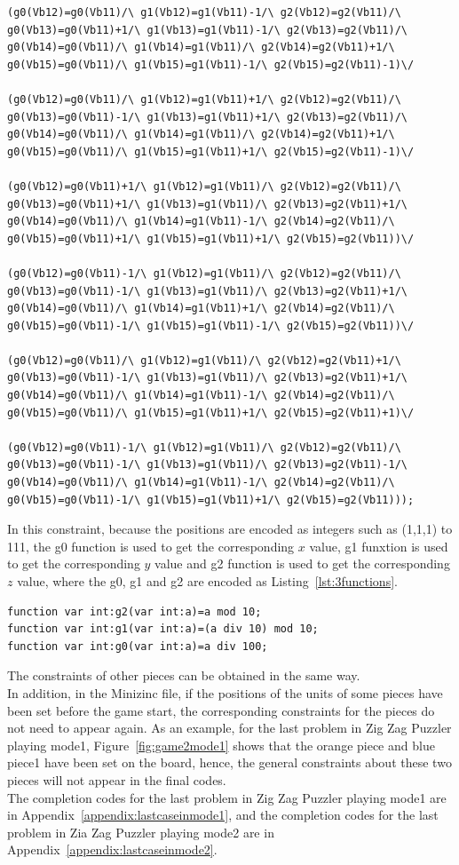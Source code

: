 \begin{lstlisting}[language=minizinc,numbers=none,caption={Encoding for 3Dblue piece1},label={lst:constraint}]
(g0(Vb12)=g0(Vb11)/\ g1(Vb12)=g1(Vb11)-1/\ g2(Vb12)=g2(Vb11)/\ g0(Vb13)=g0(Vb11)+1/\ g1(Vb13)=g1(Vb11)-1/\ g2(Vb13)=g2(Vb11)/\ g0(Vb14)=g0(Vb11)/\ g1(Vb14)=g1(Vb11)/\ g2(Vb14)=g2(Vb11)+1/\ g0(Vb15)=g0(Vb11)/\ g1(Vb15)=g1(Vb11)-1/\ g2(Vb15)=g2(Vb11)-1)\/ 

(g0(Vb12)=g0(Vb11)/\ g1(Vb12)=g1(Vb11)+1/\ g2(Vb12)=g2(Vb11)/\ g0(Vb13)=g0(Vb11)-1/\ g1(Vb13)=g1(Vb11)+1/\ g2(Vb13)=g2(Vb11)/\ g0(Vb14)=g0(Vb11)/\ g1(Vb14)=g1(Vb11)/\ g2(Vb14)=g2(Vb11)+1/\ g0(Vb15)=g0(Vb11)/\ g1(Vb15)=g1(Vb11)+1/\ g2(Vb15)=g2(Vb11)-1)\/ 

(g0(Vb12)=g0(Vb11)+1/\ g1(Vb12)=g1(Vb11)/\ g2(Vb12)=g2(Vb11)/\ g0(Vb13)=g0(Vb11)+1/\ g1(Vb13)=g1(Vb11)/\ g2(Vb13)=g2(Vb11)+1/\ g0(Vb14)=g0(Vb11)/\ g1(Vb14)=g1(Vb11)-1/\ g2(Vb14)=g2(Vb11)/\ g0(Vb15)=g0(Vb11)+1/\ g1(Vb15)=g1(Vb11)+1/\ g2(Vb15)=g2(Vb11))\/ 

(g0(Vb12)=g0(Vb11)-1/\ g1(Vb12)=g1(Vb11)/\ g2(Vb12)=g2(Vb11)/\ g0(Vb13)=g0(Vb11)-1/\ g1(Vb13)=g1(Vb11)/\ g2(Vb13)=g2(Vb11)+1/\ g0(Vb14)=g0(Vb11)/\ g1(Vb14)=g1(Vb11)+1/\ g2(Vb14)=g2(Vb11)/\ g0(Vb15)=g0(Vb11)-1/\ g1(Vb15)=g1(Vb11)-1/\ g2(Vb15)=g2(Vb11))\/ 

(g0(Vb12)=g0(Vb11)/\ g1(Vb12)=g1(Vb11)/\ g2(Vb12)=g2(Vb11)+1/\ g0(Vb13)=g0(Vb11)-1/\ g1(Vb13)=g1(Vb11)/\ g2(Vb13)=g2(Vb11)+1/\ g0(Vb14)=g0(Vb11)/\ g1(Vb14)=g1(Vb11)-1/\ g2(Vb14)=g2(Vb11)/\ g0(Vb15)=g0(Vb11)/\ g1(Vb15)=g1(Vb11)+1/\ g2(Vb15)=g2(Vb11)+1)\/ 

(g0(Vb12)=g0(Vb11)-1/\ g1(Vb12)=g1(Vb11)/\ g2(Vb12)=g2(Vb11)/\ g0(Vb13)=g0(Vb11)-1/\ g1(Vb13)=g1(Vb11)/\ g2(Vb13)=g2(Vb11)-1/\ g0(Vb14)=g0(Vb11)/\ g1(Vb14)=g1(Vb11)-1/\ g2(Vb14)=g2(Vb11)/\ g0(Vb15)=g0(Vb11)-1/\ g1(Vb15)=g1(Vb11)+1/\ g2(Vb15)=g2(Vb11)));
\end{lstlisting}
\bigskip
\smallbreak
In this constraint, because the positions are encoded as integers such as (1,1,1) to 111, the g0 function is used to get the corresponding $x$ value, g1 funxtion is used to get the corresponding $y$ value and g2 function is used to get the corresponding $z$ value, where the g0, g1 and g2 are encoded as Listing~\ref{lst:3functions}.
\begin{lstlisting}[language=minizinc,numbers=none,caption={Encoding for 3Dblue piece1},label={lst:3functions}]
function var int:g2(var int:a)=a mod 10;
function var int:g1(var int:a)=(a div 10) mod 10;
function var int:g0(var int:a)=a div 100;
\end{lstlisting}
\bigskip
\smallbreak
The constraints of other pieces can be obtained in the same way. 
\\In addition, in the Minizinc file, if the positions of the units of some pieces have been set before the game start, the corresponding constraints for the pieces do not need to appear again. As an example, for the last problem in Zig Zag Puzzler playing mode1, Figure~\ref{fig:game2mode1} shows that the orange piece and blue piece1 have been set on the board, hence, the general constraints about these two pieces will not appear in the final codes.
\\The completion codes for the last problem in Zig Zag Puzzler playing mode1 are in Appendix~\ref{appendix:lastcaseinmode1}, and the completion codes for the last problem in Zia Zag Puzzler playing mode2 are in Appendix~\ref{appendix:lastcaseinmode2}. 